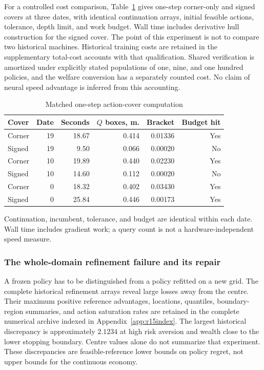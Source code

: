 \documentclass[ecta,nameyear,draft]{econsocart}
\theoremstyle{definition}
\theoremstyle{remark}
\begin{document}
For a controlled cost comparison, Table~\ref{tab:r9matched} gives one-step corner-only and signed covers at three dates, with identical continuation arrays, initial feasible actions, tolerance, depth limit, and work budget. Wall time includes derivative hull construction for the signed cover. The point of this experiment is not to compare two historical machines. Historical training costs are retained in the supplementary total-cost accounts with that qualification. Shared verification is amortized under explicitly stated populations of one, nine, and one hundred policies, and the welfare conversion has a separately counted cost. No claim of neural speed advantage is inferred from this accounting.

\begin{table}[htbp]
\centering\small\setlength{\tabcolsep}{4pt}
\caption{Matched one-step action-cover computation}\label{tab:r9matched}
\begin{tabular}{lrrrrr}
\toprule
Cover & Date & Seconds & $Q$ boxes, m. & Bracket & Budget hit \\
\midrule
Corner & 19 & 18.67 & 0.414 & 0.01336 & Yes \\
Signed & 19 & 9.50 & 0.066 & 0.00020 & No \\
Corner & 10 & 19.89 & 0.440 & 0.02230 & Yes \\
Signed & 10 & 14.60 & 0.112 & 0.00020 & No \\
Corner & 0 & 18.32 & 0.402 & 0.03430 & Yes \\
Signed & 0 & 25.84 & 0.446 & 0.00173 & Yes \\
\bottomrule
\end{tabular}
\par\vspace{3pt}\begin{minipage}{0.97\linewidth}\footnotesize Continuation, incumbent, tolerance, and budget are identical within each date. Wall time includes gradient work; a query count is not a hardware-independent speed measure.\end{minipage}
\end{table}



\subsubsection{The whole-domain refinement failure and its repair}
A frozen policy has to be distinguished from a policy refitted on a new grid. The complete historical refinement arrays reveal large losses away from the centre. Their maximum positive reference advantages, locations, quantiles, boundary-region summaries, and action saturation rates are retained in the complete numerical archive indexed in Appendix~\ref{app:r15index}. The largest historical discrepancy is approximately $2.1234$ at high risk aversion and wealth close to the lower stopping boundary. Centre values alone do not summarize that experiment. These discrepancies are feasible-reference lower bounds on policy regret, not upper bounds for the continuous economy.
\end{document}
